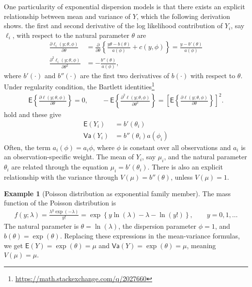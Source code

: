 \documentclass[
  11pt,
  letterpaper,
]{book}
\renewcommand{\href}[2]{#2\footnote{\url{#1}}}
\theoremstyle{definition}
\theoremstyle{definition}
\newtheorem{example}{Example}[chapter]
\theoremstyle{definition}
\theoremstyle{definition}
\theoremstyle{remark}
\begin{document}
One particularity of exponential dispersion models is that there exists
an explicit relationship between mean and variance of \(Y\), which the
following derivation shows. the first and second derivative of the log
likelihood contribution of \(Y_i\), say \(\ell_i\), with respect to the
natural parameter \(\theta\) are
\begin{align*}
\frac{\partial \ell_i(y; \theta, \phi)}{\partial \theta} &= \frac{\partial}{\partial \theta} \left\{\frac{y\theta-b(\theta)}{a(\phi)} + c(y, \phi) \right\} = \frac{y - b'(\theta)}{a(\phi)}\\
\frac{\partial^2 \ell_i(y; \theta, \phi)}{\partial \theta^2} &= - \frac{b''(\theta)}{a(\phi)},
\end{align*}
where \(b'(\cdot)\) and \(b''(\cdot)\) are the first two
derivatives of \(b(\cdot)\) with respect to \(\theta\). Under regularity
condition, the \href{https://math.stackexchange.com/q/2027660}{Bartlett identities}
\begin{align*}
\mathsf{E}\left\{\frac{\partial \ell(y; \theta, \phi)}{\partial \theta}\right\}=0, \qquad - \mathsf{E}\left\{\frac{\partial^2 \ell(y; \theta, \phi)}{\partial \theta^2}\right\} = \left[\mathsf{E}\left\{\frac{\partial \ell(y; \theta, \phi)}{\partial \theta}\right\}\right]^2.
\end{align*}
hold and these give
\begin{align*}
\mathsf{E}(Y_i) &= b'(\theta_i) \\
\mathsf{Va}(Y_i) &= b''(\theta_i)a(\phi_i)
\end{align*}
Often, the term \(a_i(\phi)=a_i\phi\), where \(\phi\) is
constant over all observations and \(a_i\) is an observation-specific
weight. The mean of \(Y_i\), say \(\mu_i\), and the natural parameter
\(\theta_i\) are related through the equation \(\mu_i=b'(\theta_i)\). There
is also an explicit relationship with the variance through
\(V(\mu)=b''(\theta)\), unless \(V(\mu)=1\).

\begin{example}[Poisson distribution as exponential family member]
\protect\hypertarget{exm:poissonglmexpf}{}\label{exm:poissonglmexpf}The mass function of the Poisson distribution is
\begin{align*}
f(y; \lambda) = \frac{\lambda^y \exp(-\lambda)}{y!} =\exp \left\{ y \ln
(\lambda) -\lambda-\ln(y!)\right\}, \qquad y=0,1, \ldots
\end{align*}
The natural parameter is \(\theta =\ln(\lambda)\), the dispersion
parameter \(\phi=1\), and \(b(\theta)=\exp(\theta)\). Replacing these expressions in the mean-variance formulas, we get \(\mathsf{E}(Y)=\exp(\theta)=\mu\) and \(\mathsf{Va}(Y)=\exp(\theta)=\mu\), meaning \(V(\mu)=\mu\).
\end{example}
\end{document}
